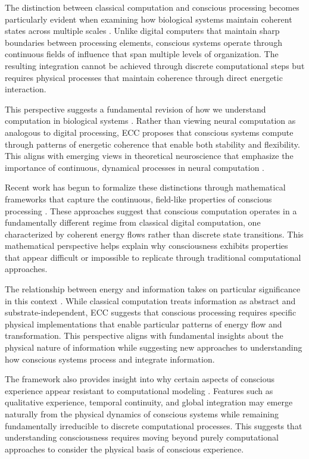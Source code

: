 The distinction between classical computation and conscious processing becomes particularly evident when examining how biological systems maintain coherent states across multiple scales \cite{MacLennan2004}. Unlike digital computers that maintain sharp boundaries between processing elements, conscious systems operate through continuous fields of influence that span multiple levels of organization. The resulting integration cannot be achieved through discrete computational steps but requires physical processes that maintain coherence through direct energetic interaction.

This perspective suggests a fundamental revision of how we understand computation in biological systems \cite{Adriaans2013}. Rather than viewing neural computation as analogous to digital processing, ECC proposes that conscious systems compute through patterns of energetic coherence that enable both stability and flexibility. This aligns with emerging views in theoretical neuroscience that emphasize the importance of continuous, dynamical processes in neural computation \cite{Piccinini2015}.

Recent work has begun to formalize these distinctions through mathematical frameworks that capture the continuous, field-like properties of conscious processing \cite{Siegelmann2003}. These approaches suggest that conscious computation operates in a fundamentally different regime from classical digital computation, one characterized by coherent energy flows rather than discrete state transitions. This mathematical perspective helps explain why consciousness exhibits properties that appear difficult or impossible to replicate through traditional computational approaches.

The relationship between energy and information takes on particular significance in this context \cite{Landauer1996}. While classical computation treats information as abstract and substrate-independent, ECC suggests that conscious processing requires specific physical implementations that enable particular patterns of energy flow and transformation. This perspective aligns with fundamental insights about the physical nature of information while suggesting new approaches to understanding how conscious systems process and integrate information.

The framework also provides insight into why certain aspects of conscious experience appear resistant to computational modeling \cite{Searle1990}. Features such as qualitative experience, temporal continuity, and global integration may emerge naturally from the physical dynamics of conscious systems while remaining fundamentally irreducible to discrete computational processes. This suggests that understanding consciousness requires moving beyond purely computational approaches to consider the physical basis of conscious experience.

